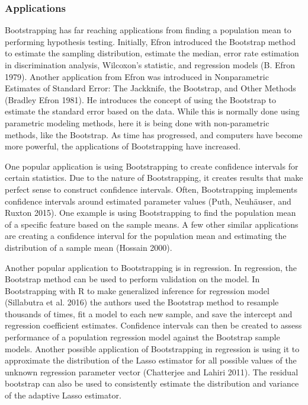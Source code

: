 \documentclass[
  letterpaper,
  DIV=11,
  numbers=noendperiod]{scrartcl}
\begin{document}
\hypertarget{applications}{%
\subsubsection{Applications}\label{applications}}

Bootstrapping has far reaching applications from finding a population
mean to performing hypothesis testing. Initially, Efron introduced the
Bootstrap method to estimate the sampling distribution, estimate the
median, error rate estimation in discrimination analysis, Wilcoxon's
statistic, and regression models (B. Efron 1979). Another application
from Efron was introduced in Nonparametric Estimates of Standard Error:
The Jackknife, the Bootstrap, and Other Methods (Bradley Efron 1981). He
introduces the concept of using the Bootstrap to estimate the standard
error based on the data. While this is normally done using parametric
modeling methods, here it is being done with non-parametric methods,
like the Bootstrap. As time has progressed, and computers have become
more powerful, the applications of Bootstrapping have increased.

One popular application is using Bootstrapping to create confidence
intervals for certain statistics. Due to the nature of Bootstrapping, it
creates results that make perfect sense to construct confidence
intervals. Often, Bootstrapping implements confidence intervals around
estimated parameter values (Puth, Neuhäuser, and Ruxton 2015). One
example is using Bootstrapping to find the population mean of a specific
feature based on the sample means. A few other similar applications are
creating a confidence interval for the population mean and estimating
the distribution of a sample mean (Hossain 2000).

Another popular application to Bootstrapping is in regression. In
regression, the Bootstrap method can be used to perform validation on
the model. In Bootstrapping with R to make generalized inference for
regression model (Sillabutra et al. 2016) the authors used the Bootstrap
method to resample thousands of times, fit a model to each new sample,
and save the intercept and regression coefficient estimates. Confidence
intervals can then be created to assess performance of a population
regression model against the Bootstrap sample models. Another possible
application of Bootstrapping in regression is using it to approximate
the distribution of the Lasso estimator for all possible values of the
unknown regression parameter vector (Chatterjee and Lahiri 2011). The
residual bootstrap can also be used to consistently estimate the
distribution and variance of the adaptive Lasso estimator.
\end{document}
